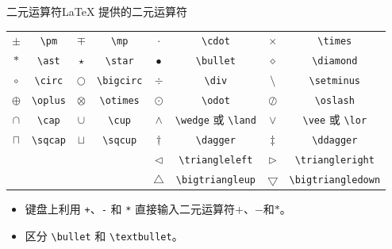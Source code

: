 \documentclass[mathserif]{beamer}
\begin{document}
\begin{frame}[fragile]{二元运算符}{\LaTeX{} 提供的二元运算符}
\begin{table}[H]
\centering
\begin{tabular}{cc|cc|cc|cc}
	\toprule
	$\pm$ & \lstinline'\pm' & $\mp$ & \lstinline'\mp' & $\cdot$ & \lstinline'\cdot' & $\times$ & \lstinline'\times' \\
	$\ast$ & \lstinline'\ast' & $\star$ & \lstinline'\star' & $\bullet$ & \lstinline'\bullet' & $\diamond$ & \lstinline'\diamond' \\
	$\circ$ & \lstinline'\circ' & $\bigcirc$ & \lstinline'\bigcirc' & $\div$ & \lstinline'\div' & $\setminus$ & \lstinline'\setminus' \\
	$\oplus$ & \lstinline'\oplus' & $\otimes$ & \lstinline'\otimes' & $\odot$ & \lstinline'\odot' & $\oslash$ & \lstinline'\oslash' \\
	$\cap$ & \lstinline'\cap' & $\cup$ & \lstinline'\cup' & $\land$ & \lstinline'\wedge' 或 \lstinline'\land' & $\lor$ & \lstinline'\vee' 或 \lstinline'\lor' \\
	$\sqcap$ & \lstinline'\sqcap' & $\sqcup$ & \lstinline'\sqcup' & $\dagger$ & \lstinline'\dagger' & $\ddagger$ & \lstinline'\ddagger' \\
	~ & ~ & ~ & ~ & $\triangleleft$ & \lstinline'\triangleleft' & $\triangleright$ & \lstinline'\triangleright' \\
	~ & ~ & ~ & ~ & $\bigtriangleup$ & \lstinline'\bigtriangleup' & $\bigtriangledown$ & \lstinline'\bigtriangledown' \\
	\bottomrule
\end{tabular}
\end{table}
\begin{itemize}

\item 键盘上利用 \lstinline'+'、\lstinline'-' 和 \lstinline'*' 直接输入二元运算符$+$、$-$和$*$。

\item 区分 \lstinline'\bullet' 和 \lstinline'\textbullet'。

\end{itemize}
\end{frame}
\end{document}
